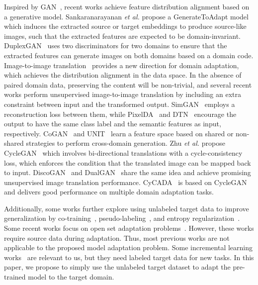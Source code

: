 Inspired by GAN~\cite{GAN}, recent works achieve feature distribution alignment based on a generative model. Sankaranarayanan \textit{et al.} propose a GenerateToAdapt model~\cite{GenToAdapt} which induces the extracted source or target embeddings to produce source-like images, such that the extracted features are expected to be domain-invariant. DuplexGAN~\cite{DuplexGAN} uses two discriminators for two domains to ensure that the extracted features can generate images on both domains based on a domain code. Image-to-image translation~\cite{Pix2Pix} provides a new direction for domain adaptation, which achieves the distribution alignment in the data space. In the absence of paired domain data, preserving the content will be non-trivial, and several recent works perform unsupervised image-to-image translation by including an extra constraint between input and the transformed output. SimGAN~\cite{SimGAN} employs a reconstruction loss between them, while PixelDA~\cite{PixelDA} and DTN~\cite{DTN} encourage the output to have the same class label and the semantic features as input, respectively. CoGAN~\cite{CoGAN} and UNIT~\cite{UNIT} learn a feature space based on shared or non-shared strategies to perform cross-domain generation. Zhu \textit{et al.} propose CycleGAN~\cite{CycleGAN} which involves bi-directional translations with a cycle-consistency loss, which enforces the condition that the translated image can be mapped back to input. DiscoGAN~\cite{DiscoGAN} and DualGAN~\cite{DualGAN} share the same idea and achieve promising unsupervised image translation performance. CyCADA~\cite{CYCADA} is based on CycleGAN and delivers good performance on multiple domain adaptation tasks.

Additionally, some works further explore using unlabeled target data to improve generalization by co-training~\cite{colearn}, pseudo-labeling~\cite{AsymTriTraining,CRST}, and entropy regularization~\cite{DIRT-T}. Some recent works focus on open set adaptation problems~\cite{UniversalDA}. However, these works require source data during adaptation. Thus, most previous works are not applicable to the proposed model adaptation problem. Some incremental learning works~\cite{LearningWoMemorize,LearningWoForget} are relevant to us, but they need labeled target data for new tasks. In this paper, we propose to simply use the unlabeled target dataset to adapt the pre-trained model to the target domain.